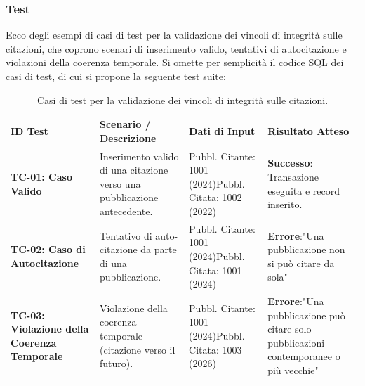 \documentclass[a4paper,12pt]{article}
\begin{document}
\subsubsection*{Test}
Ecco degli esempi di casi di test per la validazione dei vincoli di integrità sulle citazioni, che coprono scenari di inserimento valido, tentativi di autocitazione e violazioni della coerenza temporale. Si omette per semplicità il codice SQL dei casi di test, di cui si propone la seguente test suite:
\begin{table}[htbp]
\centering
\small
\caption{Casi di test per la validazione dei vincoli di integrità sulle citazioni.}
\label{tab:casi_test_citazioni}
\begin{tabularx}{\textwidth}{X X X X}
\toprule
\textbf{ID Test} & \textbf{Scenario / Descrizione} & \textbf{Dati di Input} & \textbf{Risultato Atteso} \\ 
\midrule
\textbf{TC-01: Caso Valido} & 
Inserimento valido di una citazione verso una pubblicazione antecedente. & 
Pubbl. Citante: 1001 (2024)\newline Pubbl. Citata: 1002 (2022) & 
\textbf{Successo}: Transazione eseguita e record inserito. \\ 
\midrule
\textbf{TC-02: Caso di Autocitazione} & 
Tentativo di auto-citazione da parte di una pubblicazione. & 
Pubbl. Citante: 1001 (2024)\newline Pubbl. Citata: 1001 (2024) & 
\textbf{Errore}:\newline "Una pubblicazione non si può citare da sola" \\ 
\midrule
\textbf{TC-03: Violazione della Coerenza Temporale} & 
Violazione della coerenza temporale (citazione verso il futuro). & 
Pubbl. Citante: 1001 (2024)\newline Pubbl. Citata: 1003 (2026) & 
\textbf{Errore}:\newline "Una pubblicazione può citare solo pubblicazioni contemporanee o più vecchie" \\ 
\bottomrule
\end{tabularx}
\end{table}
\end{document}
